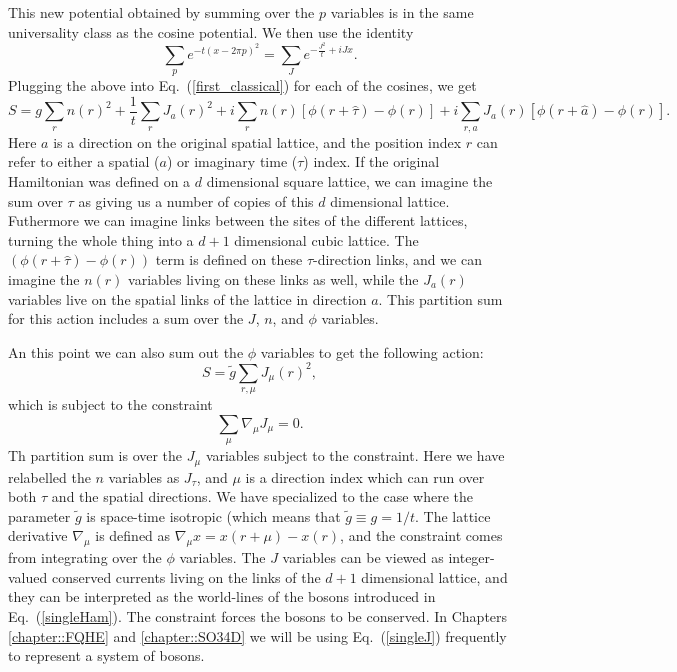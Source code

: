 This new potential obtained by summing over the $p$ variables is in the same universality class as the cosine potential. We then use the identity
\begin{equation}
\sum_p e^{-t(x-2\pi p)^2}=\sum_{J} e^{-\frac{J^2}{t}+iJ x}.
\label{Villain2}
\end{equation}
Plugging the above into Eq.~(\ref{first_classical}) for each of the cosines, we get
\begin{equation}
S=g\sum_{r} n(r)^2 + \frac{1}{t}\sum_r J_a(r)^2 + i\sum_r n(r) [\phi(r+\hat\tau)-\phi(r)] + i\sum_{r,a} J_{a}(r) [\phi(r+\hat a)-\phi(r)].
\end{equation}
Here $a$ is a direction on the original spatial lattice, and the position index $r$ can refer to either a spatial ($a$) or imaginary time ($\tau$) index. If the original Hamiltonian was defined on a $d$ dimensional square lattice, we can imagine the sum over $\tau$ as giving us a number of copies of this $d$ dimensional lattice. Futhermore we can imagine links between the sites of the different lattices, turning the whole thing into a $d+1$ dimensional cubic lattice. The $(\phi(r+\hat\tau)-\phi(r))$ term is defined on these $\tau$-direction links, and we can imagine the $n(r)$ variables living on these links as well, while the $J_a(r)$ variables live on the spatial links of the lattice in direction $a$. This partition sum for this action includes a sum over the $J$, $n$, and $\phi$ variables.

An this point we can also sum out the $\phi$ variables to get the following action:
\begin{equation}
S=\tilde g\sum_{r,\mu} J_\mu(r)^2,
\label{singleJ}
\end{equation}
which is subject to the constraint 
\begin{equation}
\sum_\mu \nabla_\mu J_\mu=0.
\label{constraint}
\end{equation}
Th partition sum is over the $J_\mu$ variables subject to the constraint. Here we have relabelled the $n$ variables as $J_\tau$, and $\mu$ is a direction index which can run over both $\tau$ and the spatial directions. We have specialized to the case where the parameter $\tilde g$ is space-time isotropic (which means that $\tilde{g}\equiv g=1/t$. The lattice derivative $\nabla_\mu$ is defined as $\nabla_\mu x= x(r+\mu)-x(r)$, and the constraint comes from integrating over the $\phi$ variables. The $J$ variables can be viewed as integer-valued conserved currents living on the links of the $d+1$ dimensional lattice, and they can be interpreted as the world-lines of the bosons introduced in Eq.~(\ref{singleHam}). The constraint forces the bosons to be conserved. In Chapters \ref{chapter::FQHE} and \ref{chapter::SO34D} we will be using Eq.~(\ref{singleJ}) frequently to represent a system of bosons.

